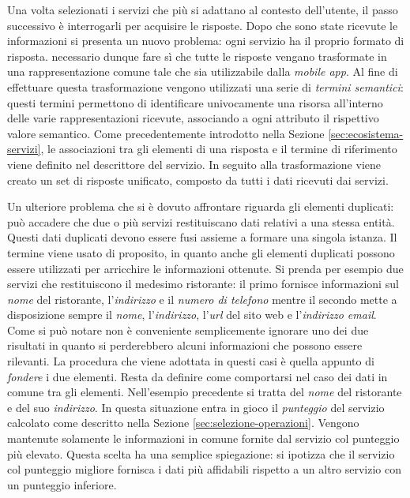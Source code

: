 Una volta selezionati i servizi che più si adattano al contesto dell'utente, il passo successivo è interrogarli per acquisire le risposte. Dopo che sono state ricevute le informazioni si presenta un nuovo problema: ogni servizio ha il proprio formato di risposta. \upe necessario dunque fare sì che tutte le risposte vengano trasformate in una rappresentazione comune tale che sia utilizzabile dalla \emph{mobile app}. Al fine di effettuare questa trasformazione vengono utilizzati una serie di \emph{termini semantici}: questi termini permettono di identificare univocamente una risorsa all'interno delle varie rappresentazioni ricevute, associando a ogni attributo il rispettivo valore semantico. Come precedentemente introdotto nella Sezione \ref{sec:ecosistema-servizi}, le associazioni tra gli elementi di una risposta e il termine di riferimento viene definito nel descrittore del servizio. In seguito alla trasformazione viene creato un set di risposte unificato, composto da tutti i dati ricevuti dai servizi.

Un ulteriore problema che si è dovuto affrontare riguarda gli elementi duplicati: può accadere che due o più servizi restituiscano dati relativi a una stessa entità. Questi dati duplicati devono essere fusi assieme a formare una singola istanza. Il termine  viene usato di proposito, in quanto anche gli elementi duplicati possono essere utilizzati per arricchire le informazioni ottenute. Si prenda per esempio due servizi che restituiscono il medesimo ristorante: il primo fornisce informazioni sul \emph{nome} del ristorante, l'\emph{indirizzo} e il \emph{numero di telefono} mentre il secondo mette a disposizione sempre il \emph{nome}, l'\emph{indirizzo}, l'\emph{url} del sito web e l'\emph{indirizzo email}. Come si può notare non è conveniente semplicemente ignorare uno dei due risultati in quanto si perderebbero alcuni informazioni che possono essere rilevanti. La procedura che viene adottata in questi casi è quella appunto di \emph{fondere} i due elementi. Resta da definire come comportarsi nel caso dei dati in comune tra gli elementi. Nell'esempio precedente si tratta del \emph{nome} del ristorante e del suo \emph{indirizzo}. In questa situazione entra in gioco il \emph{punteggio} del servizio calcolato come descritto nella Sezione \ref{sec:selezione-operazioni}. Vengono mantenute solamente le informazioni in comune fornite dal servizio col punteggio più elevato. Questa scelta ha una semplice spiegazione: si ipotizza che il servizio col punteggio migliore fornisca i dati più affidabili rispetto a un altro servizio con un punteggio inferiore.

